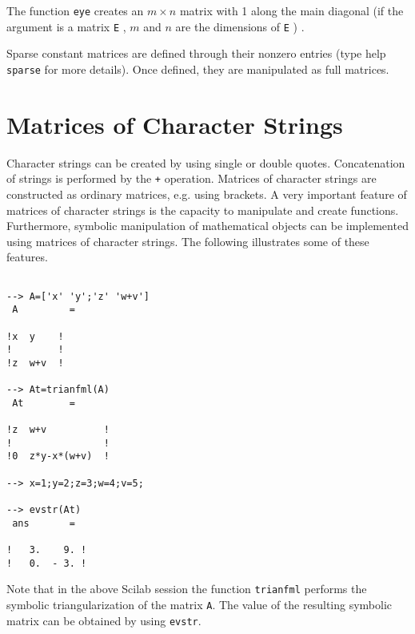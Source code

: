 The function {\tt eye} creates an $m\times n$ matrix with 1 along the main
diagonal (if the argument is a matrix {\tt E} , $m$ and $n$ are the 
dimensions of {\tt E} ) .

Sparse constant matrices are defined through their nonzero entries 
(type help {\tt sparse} for more details). Once defined, they are
manipulated as full matrices.


\section{Matrices of Character Strings}
\label{s2.3}

	Character strings can be created by using single or double quotes.
Concatenation of strings is performed by the {\tt +} operation.
Matrices of character strings are constructed as ordinary matrices,
e.g. using brackets.  A very important feature of matrices of
character strings is the capacity to manipulate and create functions.
Furthermore, symbolic manipulation of mathematical objects can be
implemented using matrices of character strings.  The following
illustrates some of these features.
\begin{verbatim}
 
--> A=['x' 'y';'z' 'w+v']
 A         =
 
!x  y    !
!        !
!z  w+v  !
 
--> At=trianfml(A)
 At        =
 
!z  w+v          !
!                !
!0  z*y-x*(w+v)  !
 
--> x=1;y=2;z=3;w=4;v=5;
 
--> evstr(At)
 ans       =
 
!   3.    9. !
!   0.  - 3. !

\end{verbatim}
Note that in the above Scilab session the function 
{\tt trianfml}
performs the symbolic triangularization of the matrix {\tt A}.
The value of the resulting symbolic matrix can be obtained by
using {\tt evstr}.  


